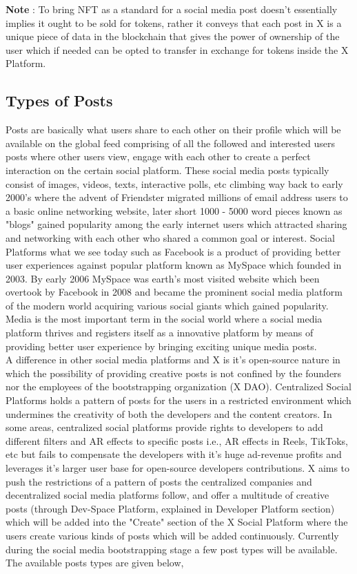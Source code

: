 \documentclass[letterpaper,11pt]{article}
\begin{document}
\textbf{Note} : To bring NFT as a standard for a social media post doesn't essentially implies it ought to be sold for tokens, rather it conveys that each post in X is a unique piece of data in the blockchain that gives the power of ownership of the user which if needed can be opted to transfer in exchange for tokens inside the X Platform.

\subsection{\textbf{Types of Posts}}

Posts are basically what users share to each other on their profile which will be available on the global feed comprising of all the followed and interested users posts where other users view, engage with each other to create a perfect interaction on the certain social platform. These social media posts typically consist of images, videos, texts, interactive polls, etc climbing way back to early 2000's where the advent of Friendster migrated millions of email address users to a basic online networking website, later short 1000 - 5000 word pieces known as "blogs" gained popularity among the early internet users which attracted sharing and networking with each other who shared a common goal or interest. Social Platforms what we see today such as Facebook is a product of providing better user experiences against popular platform known as MySpace which founded in 2003. By early 2006 MySpace was earth's most visited website which been overtook by Facebook in 2008 and became the prominent social media platform of the modern world acquiring various social giants which gained popularity. Media is the most important term in the social world where a social media platform thrives and registers itself as a innovative platform by means of providing better user experience by bringing exciting unique media posts.\\

A difference in other social media platforms and X is it's open-source nature in which the possibility of providing creative posts is not confined by the founders nor the employees of the bootstrapping organization (X DAO). Centralized Social Platforms holds a pattern of posts for the users in a restricted environment which undermines the creativity of both the developers and the content creators. In some areas, centralized social platforms provide rights to developers to add different filters and AR effects to specific posts i.e., AR effects in Reels, TikToks, etc but fails to compensate the developers with it's huge ad-revenue profits and  leverages it's larger user base for open-source developers contributions. X aims to push the restrictions of a pattern of posts the centralized companies and decentralized social media platforms follow, and offer a multitude of creative posts (through Dev-Space Platform, explained in Developer Platform section) which will be added into the "Create" section of the X Social Platform where the users create various kinds of posts which will be added continuously. Currently during the social media bootstrapping stage a few post types will be available. The available posts types are given below, \\ 
\end{document}
